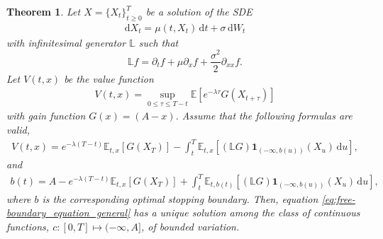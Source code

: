 \documentclass{tufte-handout}
\newcommand{\E}{\mathbb{E}} %
\newcommand{\InfGen}{\mathbb{L}} %
\newcommand{\dif}{\mathrm{d}}
\newtheorem{thm}{Theorem}
\begin{document}
	\begin{thm}
		Let $X = \{X_t\}_{t\geq 0}^T$ be a solution of the SDE
		\begin{align*}
			\dif X_t = \mu(t, X_t)\,\dif t + \sigma\,\dif W_t
		\end{align*}
		with infinitesimal generator $\InfGen$ such that
		$$
		\InfGen f = \partial_t f + \mu\partial_xf + \frac{\sigma^2}{2}\partial_{xx}f. 
		$$
		Let $V(t, x)$ be the value function
		\begin{align}\label{eq:OST_general}
			V(t, x) = \sup_{0\leq \tau \leq T - t}\E\left[e^{-\lambda \tau}G(X_{t + \tau})\right]
		\end{align}
		with gain function $G(x) = (A - x)$. Assume that the following formulas are valid,
		\begin{align}\label{eq:pricing_formula_general}
			V(t, x) = e^{-\lambda (T - t)}\E_{t, x}[G(X_T)] - \int_{t}^{T}\E_{t, x}[(\InfGen G)\mathbf{1}_{(-\infty, b(u))}(X_u)\,\dif u], 
		\end{align}
		and
		\begin{align}\label{eq:free-boundary_equation_general}
			b(t) = A - e^{-\lambda (T - t)}\E_{t, x}[G(X_T)] + \int_{t}^{T}\E_{t, b(t)}[(\InfGen G)\mathbf{1}_{(-\infty, b(u))}(X_u)\,\dif u],
		\end{align}
		where $b$ is the corresponding optimal stopping boundary. Then, equation \eqref{eq:free-boundary_equation_general} has a unique solution among the class of continuous functions, $c:[0, T]\mapsto (-\infty, A]$, of bounded variation.  	
	\end{thm}
\end{document}

